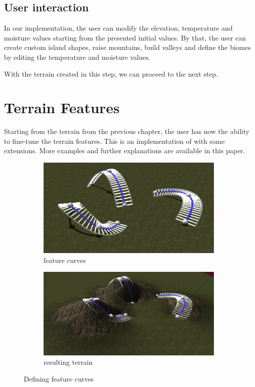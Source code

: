 \documentclass[journal, letterpaper]{IEEEtran}
\begin{document}
\subsection{User interaction}
In our implementation, the user can modify the elevation, temperature and moisture values starting from the presented initial values.
By that, the user can create custom island shapes, raise mountains, build valleys and define the biomes by editing the temperature and moisture values.

With the terrain created in this step, we can proceed to the next step.

\section{Terrain Features}\label{TerrainFeatures}
Starting from the terrain from the previous chapter, the user has now the ability to fine-tune the terrain features.
This is an implementation of \cite{Hnaidi.2010} with some extensions. More examples and further explanations are available in this paper.

\begin{figure}
	\centering
	\begin{subfigure}[b]{0.45\textwidth}
		\includegraphics[width=\textwidth]{images/diffusion1}
		\caption{feature curves}
		\label{fig:featurecurves}
	\end{subfigure}
	\begin{subfigure}[b]{0.45\textwidth}
		\includegraphics[width=\textwidth]{images/diffusion2}
		\caption{resulting terrain}
		\label{fig:resultingterrain}
	\end{subfigure}
	\caption{Defining feature curves}\label{fig:diffusion1}
\end{figure}
\end{document}
